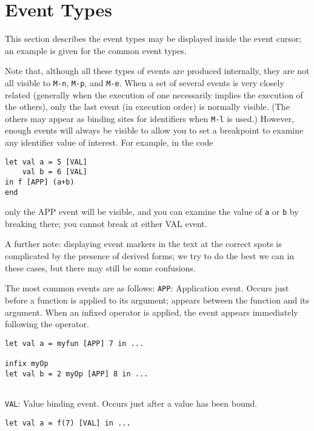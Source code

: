 \section{Event Types}
This section describes the event types may be displayed 
inside the event cursor; an example is given for the common event types.

Note that, although all these types of events are produced internally, they
are not all visible to \verb'M-n', \verb'M-p', and \verb'M-e'.  When a set of
several events is very closely related (generally when the execution of 
one necessarily implies the execution of the others), only the last event
(in execution order) is normally visible.  (The others may appear as 
binding sites for identifiers when \verb'M-l' is used.)  However, enough 
events will always be visible to allow you to set a breakpoint to 
examine any identifier value of interest. For example, in the code

\begin{verbatim}
let val a = 5 [VAL]
    val b = 6 [VAL]
in f [APP] (a+b)
end
\end{verbatim}

only the APP event will be visible, and you can examine 
the value of \verb'a' or \verb'b' by breaking there; you cannot break
at either VAL event.
 
A further note: displaying event markers in the text at the correct spots
is complicated by the presence of derived forms; we try to do the best
we can in these cases, but there may still be some confusions.

The most common events are as follows:
\verb'APP': Application event.  Occurs just before a function is applied to
its argument; appears between the function and its argument.  When an
infixed operator is applied, the event appears immediately following
the operator.

\begin{verbatim}
let val a = myfun [APP] 7 in ...

infix myOp
let val b = 2 myOp [APP] 8 in ...
       
\end{verbatim}

\vspace{0.25in}
\verb'VAL': Value binding event.  Occurs just after a value has been bound.

\begin{verbatim}
let val a = f(7) [VAL] in ...
\end{verbatim}

